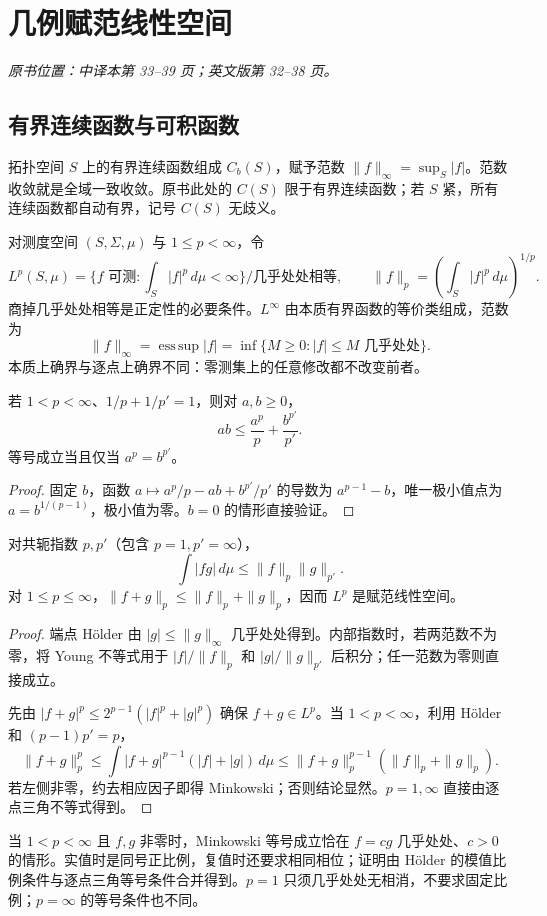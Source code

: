 \section{几例赋范线性空间}\label{sec:yosida-01-03}
\noindent\textit{原书位置：中译本第 33--39 页；英文版第 32--38 页。}

\subsection{有界连续函数与可积函数}
拓扑空间 $S$ 上的有界连续函数组成 $C_b(S)$，赋予范数 $\|f\|_\infty=\sup_S|f|$。范数收敛就是全域一致收敛。原书此处的 $C(S)$ 限于有界连续函数；若 $S$ 紧，所有连续函数都自动有界，记号 $C(S)$ 无歧义。

对测度空间 $(S,\Sigma,\mu)$ 与 $1\le p<\infty$，令
\[
 L^p(S,\mu)=\{f\text{ 可测}:\int_S|f|^p\,d\mu<\infty\}/\text{几乎处处相等},
 \qquad\|f\|_p=\left(\int_S|f|^p\,d\mu\right)^{1/p}.
\]
商掉几乎处处相等是正定性的必要条件。$L^\infty$ 由本质有界函数的等价类组成，范数为
\[
 \|f\|_\infty=\operatorname*{ess\,sup}|f|
 =\inf\{M\ge0:|f|\le M\text{ 几乎处处}\}.
\]
本质上确界与逐点上确界不同：零测集上的任意修改都不改变前者。

\begin{lemma}
若 $1<p<\infty$、$1/p+1/p'=1$，则对 $a,b\ge0$，
\[
 ab\le\frac{a^p}{p}+\frac{b^{p'}}{p'}.
\]
等号成立当且仅当 $a^p=b^{p'}$。
\end{lemma}
\begin{proof}
固定 $b$，函数 $a\mapsto a^p/p-ab+b^{p'}/p'$ 的导数为 $a^{p-1}-b$，唯一极小值点为 $a=b^{1/(p-1)}$，极小值为零。$b=0$ 的情形直接验证。
\end{proof}
\begin{theorem}\label{thm:y1-holder}
对共轭指数 $p,p'$（包含 $p=1,p'=\infty$），
\[
 \int|fg|\,d\mu\le\|f\|_p\|g\|_{p'}.
\]
对 $1\le p\le\infty$，$\|f+g\|_p\le\|f\|_p+\|g\|_p$，因而 $L^p$ 是赋范线性空间。
\end{theorem}
\begin{proof}
端点 Hölder 由 $|g|\le\|g\|_\infty$ 几乎处处得到。内部指数时，若两范数不为零，将 Young 不等式用于 $|f|/\|f\|_p$ 和 $|g|/\|g\|_{p'}$ 后积分；任一范数为零则直接成立。

先由 $|f+g|^p\le2^{p-1}(|f|^p+|g|^p)$ 确保 $f+g\in L^p$。当 $1<p<\infty$，利用 Hölder 和 $(p-1)p'=p$，
\[
 \|f+g\|_p^p
 \le\int |f+g|^{p-1}(|f|+|g|)\,d\mu
 \le\|f+g\|_p^{p-1}(\|f\|_p+\|g\|_p).
\]
若左侧非零，约去相应因子即得 Minkowski；否则结论显然。$p=1,\infty$ 直接由逐点三角不等式得到。
\end{proof}
当 $1<p<\infty$ 且 $f,g$ 非零时，Minkowski 等号成立恰在 $f=cg$ 几乎处处、$c>0$ 的情形。实值时是同号正比例，复值时还要求相同相位；证明由 Hölder 的模值比例条件与逐点三角等号条件合并得到。$p=1$ 只须几乎处处无相消，不要求固定比例；$p=\infty$ 的等号条件也不同。

